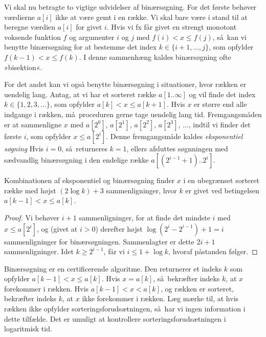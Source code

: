 Vi skal nu betragte to vigtige udvidelser af binærsøgning.
For det første behøver værdierne $a[i]$ ikke at være gemt i en række. 
Vi skal bare være i stand til at beregne værdien $a[i]$ for givet $i$. 
Hvis vi fx får givet en strengt monotont voksende funktion $f$ og argumenter $i$ og $j$ med
 $f(i) < x \le f(j)$, så kan vi benytte binærsøgning for at bestemme det index $k\in\{i+1,\ldots, j\}$, som opfylder $f(k-1) < x \le f(k)$.
I denne sammenhæng kaldes binærsøgning ofte »bisektion«.

For det andet kan vi også benytte binærsøgning i situationer, hvor rækken er uendelig lang.
Antag, at vi har et sorteret række $a[1 .. \infty]$ og vil finde det index $k\in\{1,2,3,\ldots\}$, som opfylder $a[k] < x \le a[k+1]$.
Hvis $x$ er større end alle indgange i rækken, må proceduren gerne tage uendelig lang tid.
Fremgangsmåden er at sammenligne $x$ med $a[2^0]$, $a[2^1]$, $a[2^2]$, $a[2^3]$, $\ldots$, indtil vi finder det første $i$, som opfylder $x \le a[2^i]$.
Denne fremgangsmåde kaldes \emph{eksponentiel søgning}
Hvis $i=0$, så returneres $k=1$, ellers afsluttes søgnningen med sædvandlig binærsøgning i den endelige række $a[(2^{i-1}+1) .. 2^i]$.


\begin{thm} %
  Kombinationen af eksponentiel og binærsøgning finder $x$ i en ubegrænset sorteret række med højst $(2 \log k) + 3$ sammenligninger, hvor $k$ er givet ved betingelsen $a[k-1] < x \le a[k]$.
\end{thm}

\begin{proof}
  Vi behøver $i+1$ sammenligninger, for at finde det mindste $i$ med $x \le a[2^i]$, og (givet at $i>0$) derefter højst $\log(2^i - 2^{i-1}) + 1=i$ sammenligninger for binærsøgningen. 
  Sammenlagter er dette $2i + 1$ sammenligninger. 
  Idet $k \ge 2^{i-1}$, får vi $i \le 1 + \log k$, hvoraf påstanden følger.
\end{proof}

Binærsøgning er en certificerende algoritme.
Den returnerer et indeks $k$ som opfylder $a[k-1] < x \le a[k]$. 
Hvis $x = a[k]$, så bekræfter indeks $k$, at $x$ forekommer i rækken.
Hvis $a[k-1] < x < a[k]$, og rækken er sorteret, bekræfter indeks $k$, at $x$ ikke forekommer i rækken.
Læg mærke til, at hvis rækken ikke opfylder sorteringsforudsætningen, så har vi ingen information i dette tilfælde. 
Det er umuligt at kontrollere sorteringsforudsætningen i logaritmisk tid.


